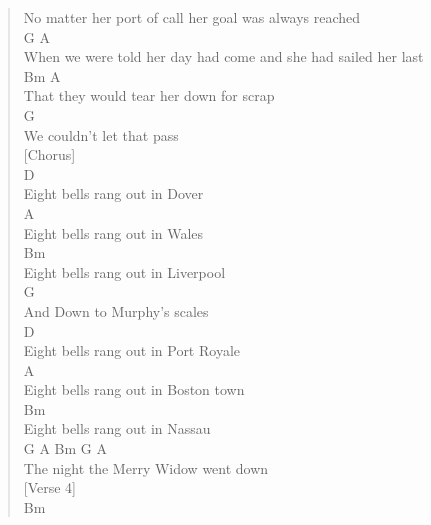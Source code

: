 \documentclass[11pt]{article}
\begin{document}
\begin{verse}
No matter her port of call her goal was always reached\\
\hspace*{5em}G                                 A\\
When we were told her day had come and she had sailed her last\\
\hspace*{5em}Bm                  A\\
That they would tear her down for scrap\\
\hspace*{3em}G\\
We couldn't let that pass\\
\vspace*{1em}
\vspace*{1em}
[Chorus]\\
\vspace*{1em}
\hspace*{7em}D\\
Eight bells rang out in Dover\\
\hspace*{7em}A\\
Eight bells rang out in Wales\\
\hspace*{7em}Bm\\
Eight bells rang out in Liverpool\\
\hspace*{5em}G\\
And Down to Murphy's scales\\
\hspace*{7em}D\\
Eight bells rang out in Port Royale\\
\hspace*{7em}A\\
Eight bells rang out in Boston town\\
\hspace*{7em}Bm\\
Eight bells rang out in Nassau\\
\hspace*{5em}G               A          Bm      G   A\\
The night the Merry Widow went down\\
\vspace*{1em}
\vspace*{1em}
[Verse 4]\\
\vspace*{1em}
\hspace*{1em}Bm\\

\end{verse}
\end{document}
